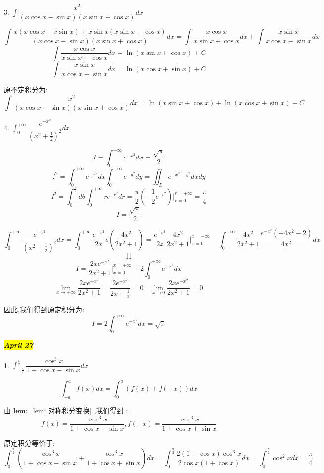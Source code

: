 
3. $\int\dfrac{x^2}{(x\cos x-\sin x)(x\sin x+\cos x)}dx$
\begin{solution}
	
	$$\int\frac{x(x\cos x-x\sin x)+x\sin x(x\sin x+\cos x)}{(x\cos x-\sin x)(x\sin x+\cos x)}dx=\int\frac{x\cos x}{x\sin x+\cos x}dx+\int\frac{x\sin x}{x\cos x-\sin x}dx$$
	$$\int\frac{x\cos x}{x\sin x+\cos x}dx=\ln(x\sin x+\cos x)+C$$
	$$\int\frac{x\sin x}{x\cos x-\sin x}dx=\ln(x\cos x+\sin x)+C$$
	
	原不定积分为: 
	$$\int\frac{x^2}{(x\cos x-\sin x)(x\sin x+\cos x)}dx=\ln(x\sin x+\cos x)+\ln(x\cos x+\sin x)+C$$
\end{solution}


4. $\int_{0}^{+\infty}\dfrac{e^{-x^2}}{(x^2+\frac{1}{2})^2}dx$
\begin{lemma}[特殊积分]\label{lem: 特殊积分}
	
	$$I=\int_{0}^{+\infty}e^{-x^2}dx=\frac{\sqrt{\pi}}{2}$$
	$$I^2=\int_{0}^{+\infty}e^{-x^2}dx\int_{0}^{+\infty}e^{-y^2}dy=\iint_{D}e^{-x^2-y^2}dxdy$$
	$$I^2=\int_{0}^{\frac{\pi}{2}}d\theta\int_{0}^{+\infty}re^{-r^2}dr=\frac{\pi}{2}(-\frac{1}{2}e^{-r^2})|_{r=0}^{r=+\infty}=\frac{\pi}{4}$$
	$$I=\frac{\sqrt{\pi}}{2}$$
\end{lemma}

\begin{solution}
	$$\int_{0}^{+\infty}\frac{e^{-x^2}}{(x^2+\frac{1}{2})^2}dx=\int_{0}^{+\infty}\frac{e^{-x^2}}{2x}d(\frac{4x^2}{2x^2+1})=\frac{e^{-x^2}}{2x}\frac{4x^2}{2x^2+1}|_{x=0}^{x=+\infty}-\int_{0}^{+\infty}\frac{4x^2}{2x^2+1}\frac{e^{-x^2}(-4x^2-2)}{4x^2}dx$$
	$$\downdownarrows$$
	$$I=\frac{2xe^{-x^2}}{2x^2+1}|_{x=0}^{x=+\infty}+2\int_{0}^{+\infty}e^{-x^2}dx$$
	$$\lim\limits_{x\rightarrow +\infty}\frac{2xe^{-x^2}}{2x^2+1}=\frac{2e^{-x^2}}{2x+\frac{1}{x}}=0 \quad \lim\limits_{x\rightarrow 0}\frac{2xe^{-x^2}}{2x^2+1}=0$$
	
	因此,我们得到原定积分为: 
	$$I=2\int_{0}^{+\infty}e^{-x^2}dx=\sqrt{\pi}$$
\end{solution}

\hl{\textbf{\textit{April 27}}}

1. $\int_{-\frac{\pi}{2}}^{\frac{\pi}{2}}\dfrac{\cos^3 x}{1+\cos x-\sin x}dx$

\begin{lemma}[对称积分变换]\label{lem: 对称积分变换}
	
	$$\int_{-a}^{a}f(x)dx=\int_{0}^{a}(f(x)+f(-x))dx$$
\end{lemma}
\begin{solution}
	
	由 $\mathbf{lem: }$ \ref{lem: 对称积分变换} ,我们得到 : 
	$$f(x)=\frac{\cos^3 x}{1+\cos x-\sin x},f(-x)=\frac{\cos^3 x}{1+\cos x+\sin x}$$
	
	原定积分等价于: 
	$$\int_{0}^{\frac{\pi}{2}}(\frac{\cos^3 x}{1+\cos x-\sin x}+\frac{\cos^3 x}{1+\cos x+\sin x})dx=\int_{0}^{\frac{\pi}{2}}\frac{2(1+\cos x)\cos^3x}{2\cos x(1+\cos x)}dx=\int_{0}^{\frac{\pi}{2}}\cos^2 xdx=\frac{\pi}{4}$$
\end{solution}

